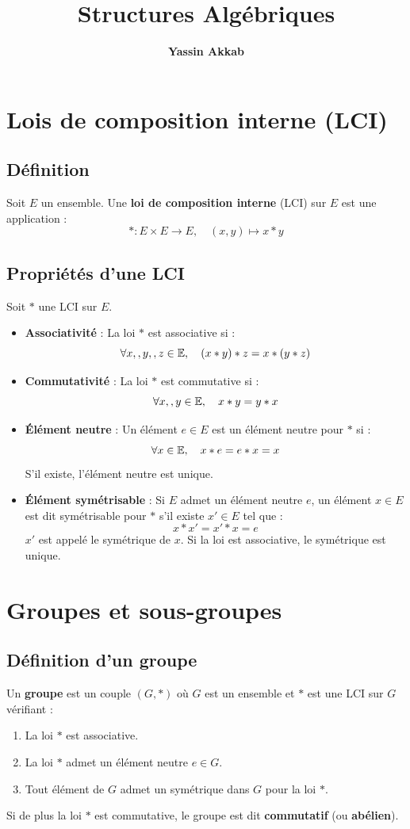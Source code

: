 \documentclass{article}
\title{\textbf{Structures Algébriques}}
\author{\textbf{Yassin Akkab}}
\begin{document}
	
	\maketitle
	\tableofcontents
	\newpage
	
	\section{Lois de composition interne (LCI)}
	
	\subsection{Définition}
	Soit $E$ un ensemble. Une \textbf{loi de composition interne} (LCI) sur $E$ est une application :
	\[ *: E \times E \to E, \quad (x, y) \mapsto x * y \]
	
	\subsection{Propriétés d'une LCI}
	Soit $*$ une LCI sur $E$.
	\begin{itemize}
		\item \textbf{Associativité} : La loi $*$ est associative si :
		\[ \qcq{x}[, y][, z]{E}, \quad (x * y) * z = x * (y * z) \]
		\item \textbf{Commutativité} : La loi $*$ est commutative si :
		\[ \qcq{x}[, y]{E}, \quad x * y = y * x \]
		\item \textbf{Élément neutre} : Un élément $e \in E$ est un élément neutre pour $*$ si :
		\[ \qcq{x}{E}, \quad x * e = e * x = x \]
		S'il existe, l'élément neutre est unique.
		\item \textbf{Élément symétrisable} : Si $E$ admet un élément neutre $e$, un élément $x \in E$ est dit symétrisable pour $*$ s'il existe $x' \in E$ tel que :
		\[ x * x' = x' * x = e \]
		$x'$ est appelé le symétrique de $x$. Si la loi est associative, le symétrique est unique.
	\end{itemize}
	
	\section{Groupes et sous-groupes}
	
	\subsection{Définition d'un groupe}
	Un \textbf{groupe} est un couple $(G, *)$ où $G$ est un ensemble et $*$ est une LCI sur $G$ vérifiant :
	\begin{enumerate}
		\item La loi $*$ est associative.
		\item La loi $*$ admet un élément neutre $e \in G$.
		\item Tout élément de $G$ admet un symétrique dans $G$ pour la loi $*$.
	\end{enumerate}
	Si de plus la loi $*$ est commutative, le groupe est dit \textbf{commutatif} (ou \textbf{abélien}).
	
\end{document}
